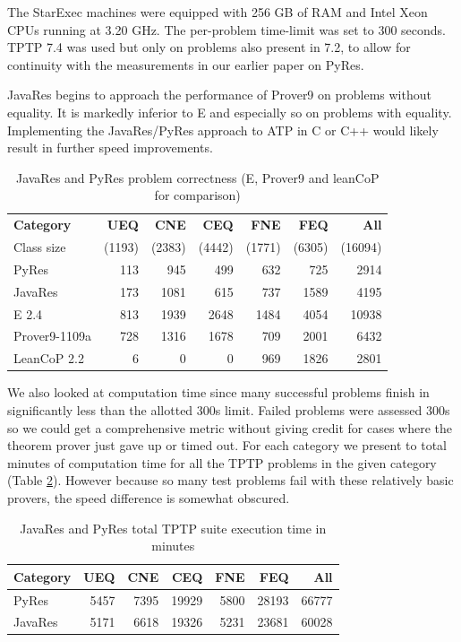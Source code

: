 \documentclass{llncs}
\begin{document}
The StarExec machines were equipped with 256 GB of RAM and Intel Xeon
CPUs running at 3.20 GHz.  The per-problem time-limit was set to 300
seconds. TPTP 7.4 was used but only on problems also present in 7.2,
to allow for continuity with the measurements in our earlier paper on
PyRes.

JavaRes begins to approach the performance of Prover9 on problems without
equality. It is markedly inferior to E and especially so on problems
with equality.  Implementing the JavaRes/PyRes approach to ATP
in C or C++ would likely result in further speed improvements.

\begin{table}[tbh]
  \begin{tabular}{lrrrrrr}
    \hline
    \textbf{Category} & \textbf{UEQ} & \textbf{CNE} & \textbf{CEQ} & \textbf{FNE} & \textbf{FEQ} & \textbf{All}\\
    {\tiny Class size} & {\tiny (1193)} & {\tiny (2383)} & {\tiny (4442)} & {\tiny (1771)} & {\tiny (6305)} & {\tiny (16094)}\\
    \hline
    PyRes              &   113 &  945 &   499 &   632 &   725 &  2914 \\
    JavaRes            &   173 & 1081 &   615 &   737 &  1589 &  4195 \\
    \hline
    E 2.4              &   813 &  1939 &  2648 &  1484 &  4054 & 10938 \\
    Prover9-1109a      &   728 &  1316 &  1678 &   709 &  2001 &  6432 \\
    LeanCoP 2.2        &     6 &     0 &     0 &   969 &  1826 &  2801 \\
    \hline
  \end{tabular}
  \caption{JavaRes and PyRes problem correctness (E, Prover9 and leanCoP for comparison)}
  \label{tab:res}
\end{table}

We also looked at computation time since many successful problems finish in significantly less than the allotted
300s limit.  Failed problems were assessed 300s so we could get a comprehensive metric without giving credit
for cases where the theorem prover just gave up or timed out.  For each category we present to total minutes of computation time for all
the TPTP problems in the given category (Table \ref{tab:res2}). However because so many test problems fail with these
relatively basic provers, the speed difference is somewhat obscured.

\begin{table}[tbh]
  \begin{tabular}{lrrrrrr}
    \hline
    \textbf{Category} & \textbf{UEQ} & \textbf{CNE} & \textbf{CEQ} & \textbf{FNE} & \textbf{FEQ} & \textbf{All}\\
    \hline
    PyRes              &   5457 &  7395 &   19929 &   5800 &   28193 &  66777 \\
    JavaRes            &   5171 &  6618 &   19326 &   5231 &   23681 &  60028 \\
    \hline
  \end{tabular}
  \caption{JavaRes and PyRes total TPTP suite execution time in minutes}
  \label{tab:res2}
\end{table}
\end{document}
